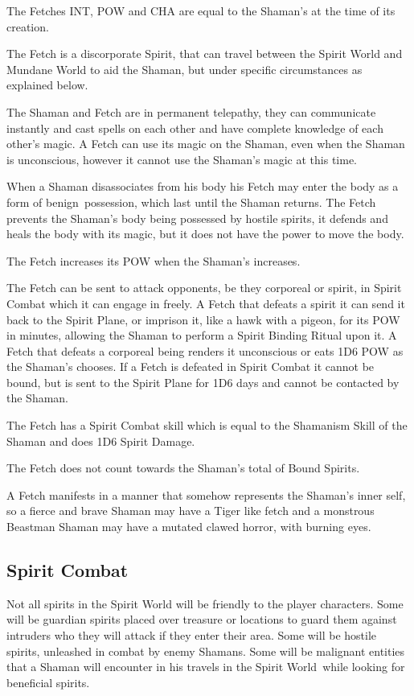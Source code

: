 \begin{rpg-list}
\item The Fetches INT, POW and CHA are equal to the Shaman’s at the time of its creation.
\item The Fetch is a discorporate Spirit, that can travel between the Spirit World and Mundane World to aid the Shaman, but under specific circumstances as explained below.
\item The Shaman and Fetch are in permanent telepathy, they can communicate instantly and cast spells on each other and have complete knowledge of each other’s magic. A Fetch can use its magic on the Shaman, even when the Shaman is unconscious, however it cannot use the Shaman’s magic at this time.
\item When a Shaman disassociates from his body his Fetch may enter the body as a form of benign possession, which last until the Shaman returns. The Fetch prevents the Shaman’s body being possessed by hostile spirits, it defends and heals the body with its magic, but it does not have the power to move the body.
\item The Fetch increases its POW when the Shaman’s increases.
\item The Fetch can be sent to attack opponents, be they corporeal or spirit, in Spirit Combat which it can engage in freely. A Fetch that defeats a spirit it can send it back to the Spirit Plane, or imprison it, like a hawk with a pigeon, for its POW in minutes, allowing the Shaman to perform a Spirit Binding Ritual upon it. A Fetch that defeats a corporeal being renders it unconscious or eats 1D6 POW as the Shaman’s chooses. If a Fetch is defeated in Spirit Combat it cannot be bound, but is sent to the Spirit Plane for 1D6 days and cannot be contacted by the Shaman.
\item The Fetch has a Spirit Combat skill which is equal to the Shamanism Skill of the Shaman and does 1D6 Spirit Damage.
\item The Fetch does not count towards the Shaman’s total of Bound Spirits.
\item A Fetch manifests in a manner that somehow represents the Shaman’s inner self, so a fierce and brave Shaman may have a Tiger like fetch and a monstrous Beastman Shaman may have a mutated clawed horror, with burning eyes.
\end{rpg-list}


\subsection{Spirit Combat}
Not all spirits in the Spirit World will be friendly to the player characters. Some will be guardian spirits placed over treasure or locations to guard them against intruders who they will attack if they enter their area. Some will be hostile spirits, unleashed in combat by enemy Shamans. Some will be malignant entities that a Shaman will encounter in his travels in the Spirit World while looking for beneficial spirits.

